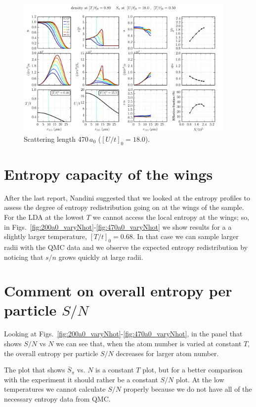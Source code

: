 \documentclass[11pt,letter]{article}
\begin{document}
\begin{figure}[H]
    \centering
\includegraphics[width=0.95\textwidth]{figures/470a0_cold.png}
\caption{Scattering length 470\,$a_{0}$ ($[U/t]_{0}=18.0$).   } 
\label{fig:470a0_varyN}
\end{figure}
 


\section{Entropy capacity of the wings} 

After the last report, Nandini suggested that we looked at the entropy
profiles to assess the degree of entropy redistribution going on at the wings
of the sample.   For the LDA at the lowest $T$ we cannot access the local
entropy at the wings;  so, in
Figs.~\ref{fig:200a0_varyNhot}-\ref{fig:470a0_varyNhot} we show results for a
a slightly larger temperature, $[T/t]_{0}=0.68$.   In that case we can sample
larger radii with the QMC data and we observe the expected entropy
redistribution by noticing that $s/n$ grows quickly at large radii.
 
\section{Comment on overall entropy per particle $S/N$}

Looking at Figs.~\ref{fig:200a0_varyNhot}-\ref{fig:470a0_varyNhot}, in the
panel that shows $S/N$ vs $N$ we can see that, when the atom number is varied
at constant $T$, the overall entropy per particle $S/N$ decreases for larger
atom number.  

The plot that shows $\bar{S}_{\pi}$ vs. $N$ is a constant $T$ plot, but for a
better comparison with the experiment it should rather be a constant $S/N$
plot.  At the low temperatures we cannot calculate $S/N$ properly because we
do not have all of the necessary entropy data from QMC.   
\end{document}
